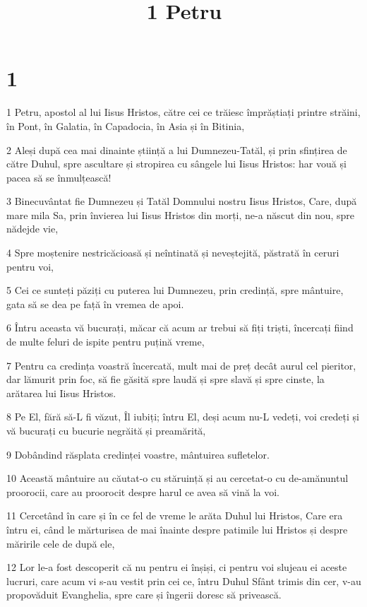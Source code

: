 

\title{1 Petru}


\chapter{1}

\par 1 Petru, apostol al lui Iisus Hristos, către cei ce trăiesc împrăștiați printre străini, în Pont, în Galatia, în Capadocia, în Asia și în Bitinia,
\par 2 Aleși după cea mai dinainte știință a lui Dumnezeu-Tatăl, și prin sfințirea de către Duhul, spre ascultare și stropirea cu sângele lui Iisus Hristos: har vouă și pacea să se înmulțească!
\par 3 Binecuvântat fie Dumnezeu și Tatăl Domnului nostru Iisus Hristos, Care, după mare mila Sa, prin învierea lui Iisus Hristos din morți, ne-a născut din nou, spre nădejde vie,
\par 4 Spre moștenire nestricăcioasă și neîntinată și neveștejită, păstrată în ceruri pentru voi,
\par 5 Cei ce sunteți păziți cu puterea lui Dumnezeu, prin credință, spre mântuire, gata să se dea pe față în vremea de apoi.
\par 6 Întru aceasta vă bucurați, măcar că acum ar trebui să fiți triști, încercați fiind de multe feluri de ispite pentru puțină vreme,
\par 7 Pentru ca credința voastră încercată, mult mai de preț decât aurul cel pieritor, dar lămurit prin foc, să fie găsită spre laudă și spre slavă și spre cinste, la arătarea lui Iisus Hristos.
\par 8 Pe El, fără să-L fi văzut, Îl iubiți; întru El, deși acum nu-L vedeți, voi credeți și vă bucurați cu bucurie negrăită și preamărită,
\par 9 Dobândind răsplata credinței voastre, mântuirea sufletelor.
\par 10 Această mântuire au căutat-o cu stăruință și au cercetat-o cu de-amănuntul proorocii, care au proorocit despre harul ce avea să vină la voi.
\par 11 Cercetând în care și în ce fel de vreme le arăta Duhul lui Hristos, Care era întru ei, când le mărturisea de mai înainte despre patimile lui Hristos și despre măririle cele de după ele,
\par 12 Lor le-a fost descoperit că nu pentru ei înșiși, ci pentru voi slujeau ei aceste lucruri, care acum vi s-au vestit prin cei ce, întru Duhul Sfânt trimis din cer, v-au propovăduit Evanghelia, spre care și îngerii doresc să privească.
